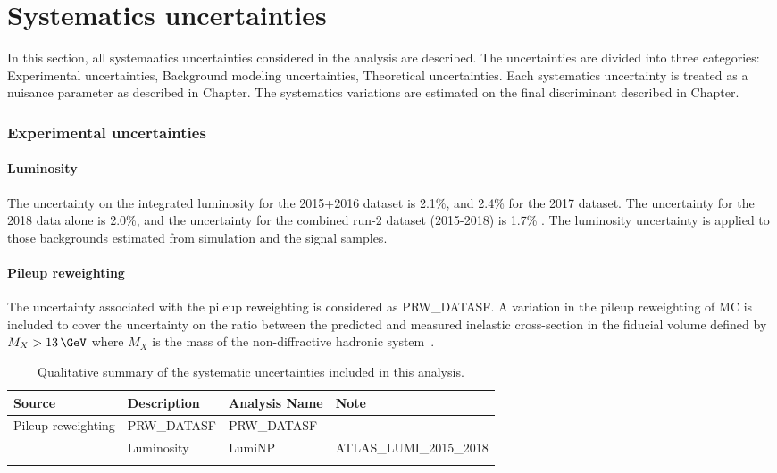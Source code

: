 \chapter{Systematics uncertainties}
In this section, all systemaatics uncertainties considered in the analysis are described. The uncertainties are divided into three categories:
Experimental uncertainties, Background modeling uncertainties, Theoretical uncertainties. Each systematics uncertainty is treated as a nuisance parameter as described in Chapter{}. The systematics variations are estimated on the final discriminant described in Chapter{}.

\subsection{Experimental uncertainties}

\subsubsection*{Luminosity}
The uncertainty on the integrated luminosity for the 2015+2016 dataset is 2.1\%,
and 2.4\% for the 2017 dataset.
The uncertainty for the 2018 data alone is 2.0\%, and the uncertainty for the combined run-2 dataset (2015-2018) is 1.7\% \cite{AtlasLumiRun2}.
The luminosity uncertainty is applied to those backgrounds estimated from simulation and the signal samples.

\subsubsection*{Pileup reweighting}
The uncertainty associated with the pileup reweighting is considered\cite{ExtendedPileupReweighting} as PRW\_DATASF.
A variation in the pileup reweighting of MC is included to cover the uncertainty on the ratio between the predicted
and measured inelastic cross-section in the fiducial volume defined by $M_X > 13\,\GeV$ where $M_X$ is the mass
of the non-diffractive hadronic system~\cite{STDM-2015-05}.

 \begin{table}[!hp]
  \centering
  \footnotesize
  \begin{center}
    \begin{tabular}{|l|l|l|l|}
      \hline
      Source        & Description                     & Analysis Name  & Note                                     \\ \hline
      Pileup reweighting & PRW\_DATASF & PRW\_DATASF \\                &
      Luminosity & LumiNP & ATLAS\_LUMI\_2015\_2018  \\\hline          &    
\end{tabular}
    \end{center}
  \caption{ Qualitative summary of the systematic uncertainties included in this analysis. }
  \label{tab:syst_summary_sources_1}
  \end{table}



